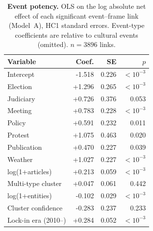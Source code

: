 \begin{table}[H]
\centering
\renewcommand{\arraystretch}{1.15}
\caption{\textbf{Event potency.} OLS on the log absolute net effect
of each significant event--frame link (Model~A), HC1 standard errors.
Event-type coefficients are relative to cultural events (omitted).
$n = 3896$ links.}
\label{tab:si_event_potency}
\vspace{0.3em}
\small
\begin{tabular}{@{}l r r r@{}}
\toprule
Variable & Coef. & SE & $p$ \\
\midrule
Intercept & -1.518 & 0.226 & $<10^{-3}$ \\
Election & +1.296 & 0.265 & $<10^{-3}$ \\
Judiciary & +0.726 & 0.376 & 0.053 \\
Meeting & +0.783 & 0.228 & $<10^{-3}$ \\
Policy & +0.591 & 0.232 & 0.011 \\
Protest & +1.075 & 0.463 & 0.020 \\
Publication & +0.470 & 0.227 & 0.039 \\
Weather & +1.027 & 0.227 & $<10^{-3}$ \\
log(1+articles) & +0.213 & 0.059 & $<10^{-3}$ \\
Multi-type cluster & +0.047 & 0.061 & 0.442 \\
log(1+entities) & -0.102 & 0.029 & $<10^{-3}$ \\
Cluster confidence & -0.283 & 0.237 & 0.233 \\
Lock-in era (2010--) & +0.284 & 0.052 & $<10^{-3}$ \\
\bottomrule
\end{tabular}
\end{table}
